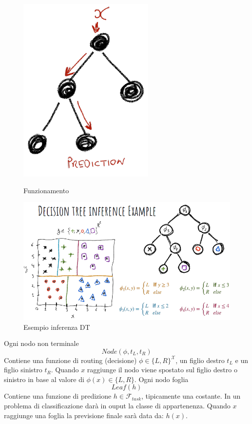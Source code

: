 \begin{figure}
	\centering
	\begin{minipage}{.3\textwidth}
		\centering
		\includegraphics[width=0.7\linewidth]{imgs/chapter5/img0}
		\caption{Funzionamento}
		\label{fig:chapter05-00}
	\end{minipage}%
	\begin{minipage}{.7\textwidth}
		\centering
		\includegraphics[width=1\linewidth]{imgs/chapter5/img1}
		\caption{Esempio inferenza DT}
		\label{fig:chapter05-01}
	\end{minipage}
\end{figure}

Ogni nodo non terminale
$$Node(\phi, t_L, t_R)$$
Contiene una funzione di routing (decisione) $\phi\in\{L, R\}^{\mathcal{X}}$, un figlio destro $t_L$ e un figlio sinistro $t_R$.
Quando $x$ raggiunge il nodo viene spostato sul figlio destro o sinistro in base al valore di $\phi(x)\in\{L,R\}$.
Ogni nodo foglia
$$Leaf(h)$$
Contiene una funzione di predizione $h\in\mathcal{F}_{task}$, tipicamente una costante. In un problema di classificazione dar\`a in ouput la classe di appartenenza. Quando $x$ raggiunge una foglia la previsione finale sar\`a data da: $h(x)$.

